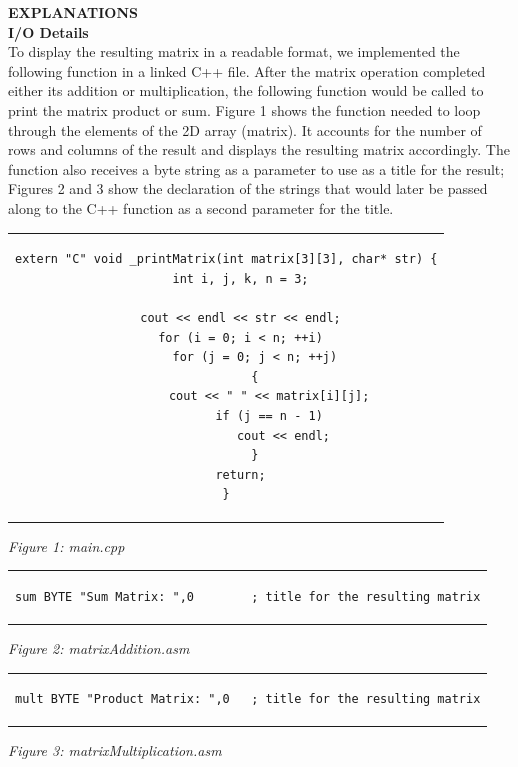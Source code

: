 \documentclass[twoside]{article}
\begin{document}
\noindent \textbf{EXPLANATIONS}
\noindent \\ \textbf{I/O Details}
\\To display the resulting matrix in a readable format, we implemented the following function in a linked C++ file. After the matrix operation completed either its addition or multiplication, the following function would be called to print the matrix product or sum. Figure 1 shows the function needed to loop through the elements of the 2D array (matrix). It accounts for the number of rows and columns of the result and displays the resulting matrix accordingly. The function also receives a byte string as a parameter to use as a title for the result; Figures 2 and 3 show the declaration of the strings that would later be passed along to the C++ function as a second parameter for the title.
\begin{center} \begin{tabular}{c} \begin{lstlisting}
extern "C" void _printMatrix(int matrix[3][3], char* str) {
	int i, j, k, n = 3;

	cout << endl << str << endl;
	for (i = 0; i < n; ++i)
		for (j = 0; j < n; ++j)
		{
			cout << " " << matrix[i][j];
			if (j == n - 1)
				cout << endl;
		}
	return;
}
\end{lstlisting} \end{tabular} \end{center}
\begin{center}\textit{Figure 1: main.cpp}\end{center}
\begin{center} \begin{tabular}{c} \begin{lstlisting}
sum BYTE "Sum Matrix: ",0        ; title for the resulting matrix
\end{lstlisting} \end{tabular} \end{center}
\begin{center}\textit{Figure 2: matrixAddition.asm}\end{center}
\begin{center} \begin{tabular}{c} \begin{lstlisting}
mult BYTE "Product Matrix: ",0   ; title for the resulting matrix
\end{lstlisting} \end{tabular} \end{center}
\begin{center}\textit{Figure 3: matrixMultiplication.asm}\end{center}
\end{document}
